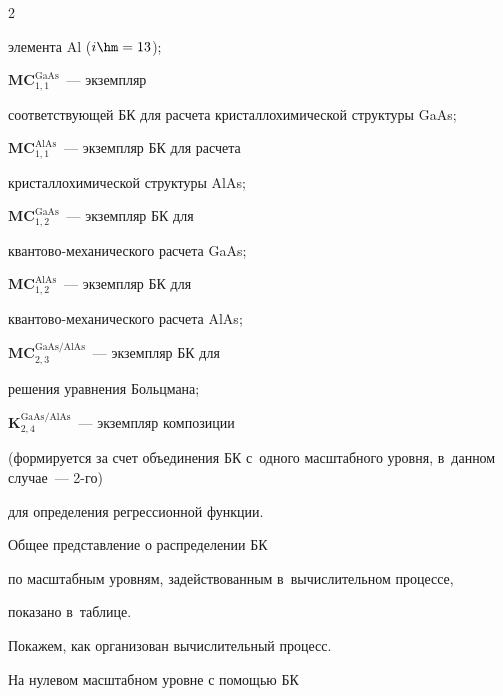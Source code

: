 \begin{multicols}{2}
\begin{description}
элемента Al ($i\hm=13$);


     \item[\,] $\mathbf{MC}_{1,1}^{\mathrm{GaAs}}$~--- экземпляр 


соответствующей БК для расчета кристаллохимической структуры GaAs; 


     \item[\,] $\mathbf{MC}_{1,1}^{\mathrm{AlAs}}$~--- экземпляр БК для расчета 


кристаллохимической структуры AlAs; 


    \item[\,] $\mathbf{MC}_{1,2}^{\mathrm{GaAs}}$~--- экземпляр БК для  


кван\-то\-во-ме\-ха\-ни\-че\-ско\-го расчета GaAs; 


     \item[\,] $\mathbf{MC}_{1,2}^{\mathrm{AlAs}}$~--- экземпляр БК для  


кван\-то\-во-ме\-ха\-ни\-че\-ско\-го расчета AlAs;


     \item[\,] $\mathbf{MC}_{2,3}^{\mathrm{GaAs/AlAs}}$~--- экземпляр БК для 


решения уравнения Больцмана;


     \item[\,] $\boldsymbol {K}_{2,4}^{\mathrm{GaAs/AlAs}}$~--- экземпляр композиции 


(формируется за счет объединения БК с~одного масштабного уровня, в~данном случае~--- 2-го) 


для определения регрессионной функции.


     \end{description}


    


     Общее представление о распределении БК 


     по масштабным уровням, задействованным в~вы\-чис\-ли\-тель\-ном процессе, 


показано в~таблице.


     


    


     


    Покажем, как организован вычислительный процесс.


    


    На нулевом масштабном уровне с помощью БК



\end{multicols}
